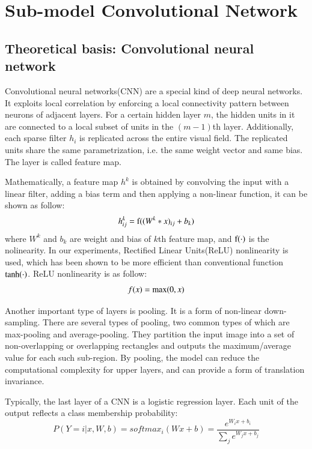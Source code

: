 \documentclass{article} %
\begin{document}
\section{Sub-model Convolutional Network}
\subsection{Theoretical basis: Convolutional neural network}
Convolutional neural networks(CNN) are a special kind of deep neural networks. It exploits local correlation by enforcing a local connectivity pattern between neurons of adjacent layers. For a certain hidden layer $m$, the hidden units in it are connected to a local subset of units in the $(m-1)$th layer. Additionally, each sparse filter $h_{i}$ is replicated across the entire visual field. The replicated units share the same parametrization, i.e. the same weight vector and same bias. The layer is called feature map. 
\par
Mathematically, a feature map $h^{k}$ is obtained by convolving the input with a linear filter, adding a bias term and then applying a non-linear function, it can be shown as follow:
\begin{equation}
h^{k}_{ij}=\textup{f}((W^{k}*x)_{ij}+b_{k})
\end{equation}
where $W^{k}$ and $b_{k}$ are weight and bias of $k$th feature map, and $\textup{f}(\cdot)$ is the nolinearity. In our experiments, Rectified Linear Units(ReLU) nonlinearity is used, which has been shown to be more efficient than conventional function $\textup{tanh}(\cdot)$.\cite{imagenet} ReLU nonlinearity is as follow:
\begin{equation}
f(x)=\textup{max}(0,x)
\end{equation}
\par
Another important type of layers is pooling. It is a form of non-linear down-sampling. There are several types of pooling, two common types of which are max-pooling and average-pooling. They partition the input image into a set of non-overlapping or overlapping rectangles and outputs the maximum/average value for each such sub-region. By pooling, the model can reduce the computational complexity for upper layers, and can provide a form of translation invariance. 
\par
Typically, the last layer of a CNN is a logistic regression layer. Each unit of the output reflects a class membership probability:
\begin{equation}
P(Y=i|x,W,b)=softmax_{i}(Wx+b)=\frac{e^{W_{i}x+b_{i}}}{\sum _{j}e^{W_{j}x+b_{j}}} 
\end{equation}
\end{document}
